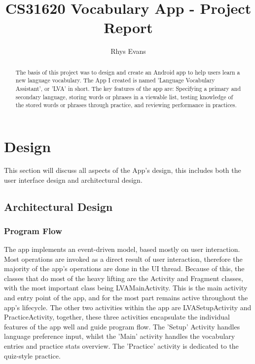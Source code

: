 \documentclass[runningheads]{llncs}
\begin{document}
	\title{CS31620 Vocabulary App - Project Report}
	\author{Rhys Evans}
	\maketitle
	
	\begin{abstract}
		The basis of this project was to design and create an Android app to help users learn a new language vocabulary. The App I created is named 'Language Vocabulary Assistant', or 'LVA' in short. The key features of the app are: Specifying a primary and secondary language, storing words or phrases in a viewable list, testing knowledge of the stored words or phrases through practice, and reviewing performance in practices.
	\end{abstract}
	
	\newpage
	\section{Design}
	This section will discuss all aspects of the App's design, this includes both the user interface design and architectural design.  
	\subsection{Architectural Design}
	\subsubsection{Program Flow}
	The app implements an event-driven model, based mostly on user interaction. Most operations are invoked as a direct result of user interaction, therefore the majority of the app's operations are done in the UI thread. Because of this, the classes that do most of the heavy lifting are the Activity and Fragment classes, with the most important class being LVAMainActivity. This is the main activity and entry point of the app, and for the most part remains active throughout the app's lifecycle. The other two activities within the app are LVASetupActivity and PracticeActivity, together, these three activities encapsulate the individual features of the app well and guide program flow. The 'Setup' Activity handles language preference input, whilst the 'Main' activity handles the vocabulary entries and practice stats overview. The 'Practice' activity is dedicated to the quiz-style practice.
	
\end{document}
